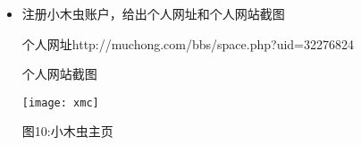 \documentclass{article}
\begin{document}
\begin{itemize}
    \item 注册小木虫账户，给出个人网址和个人网站截图
    
    个人网址http://muchong.com/bbs/space.php?uid=32276824
    
    个人网站截图
    \begin{center}
    \centering
    \texttt{[image: xmc]}
    \caption{图10:小木虫主页}
    \end{center}
    
\end{itemize}


\hspace*{\fill} \\




\end{document}
